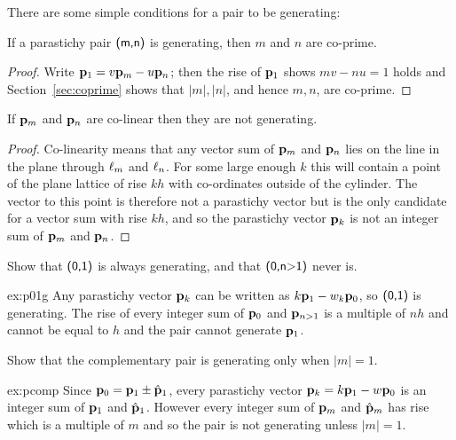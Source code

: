 There are some simple conditions for a pair to be generating:
\begin{theorem}
	\label{thm:coprime1}
	If a parastichy pair $\textsf{(m,n)}$ is generating, then $m$ and $n$ are co-prime.  
\end{theorem}
\begin{proof}
	Write ${\mathbf p}_{1}= v{\mathbf p}_{m}-u{\mathbf p}_{n}$; then the rise of ${\mathbf p}_{1}$ shows $mv-nu = 1$ holds and Section~\ref{sec:coprime} shows that $|m|,|n|$, and hence $m,n$, are co-prime.
\end{proof}
\begin{theorem}
	\label{thm:coprime}
	If ${\mathbf p}_{m}$ and ${\mathbf p}_{n}$ are co-linear then they are not generating.
\end{theorem}
\begin{proof}
	Co-linearity means that any vector sum of ${\mathbf p}_{m}$ and ${\mathbf p}_{n}$ lies on the line in the plane through $\ell_{{m}}$ and $\ell_{{n}}$. For some large enough $k$ this will contain a point of the plane lattice of rise $kh$ with co-ordinates outside of the cylinder. The vector to this point is therefore not a parastichy vector but is the only candidate for a vector sum with rise $kh$, and so the parastichy vector ${\mathbf p}_{k}$ is not an integer sum of ${\mathbf p}_{m}$ and ${\mathbf p}_{n}$.
\end{proof}
\begin{jExercise}\label{ex:p01g}
	\label{ex:01generating}
	Show that $\textsf{(0,1)}$ is always generating, and that  $\textsf{(0,n>1)}$ never is. 
\end{jExercise}
\begin{jAnswer}{ex:p01g}
	Any parastichy vector ${\mathbf p}_{k}$ can be written as $k{\mathbf p}_{1}-w_k {\mathbf p}_{0}$, so $\textsf{(0,1)}$ is generating. The rise of every integer sum of ${\mathbf p}_{0}$ and ${\mathbf p}_{n>1}$ is a multiple of $nh$ and cannot be equal to $h$ and the pair cannot generate ${\mathbf p}_{1}$.
	
\end{jAnswer}
\begin{jExercise}\label{ex:pcomp}
	Show that the complementary pair  is generating only when $|m|=1$.
\end{jExercise}
\begin{jAnswer}{ex:pcomp}
	Since ${\mathbf p}_{0}={\mathbf p}_{1}\pm\hat{\mathbf p}_{1}$, every parastichy vector ${\mathbf p}_{k}=k{\mathbf p}_{1}-w{\mathbf p}_{0}$ is an integer sum of ${\mathbf p}_{1}$ and $\hat{\mathbf p}_{1}$. However every integer sum of
	${\mathbf p}_{m}$ and $\hat{\mathbf p}_{m}$ has rise which is a multiple of $m$ and so the pair is not generating unless $|m|=1$. 
\end{jAnswer}



